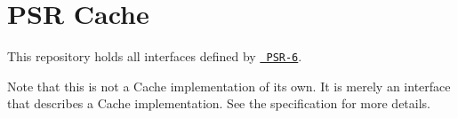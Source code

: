 \chapter{PSR Cache}
\hypertarget{md_public_2glpi_2vendor_2psr_2cache_2_r_e_a_d_m_e}{}\label{md_public_2glpi_2vendor_2psr_2cache_2_r_e_a_d_m_e}
This repository holds all interfaces defined by \href{http://www.php-fig.org/psr/psr-6/}{\texttt{ PSR-\/6}}.

Note that this is not a Cache implementation of its own. It is merely an interface that describes a Cache implementation. See the specification for more details. 
